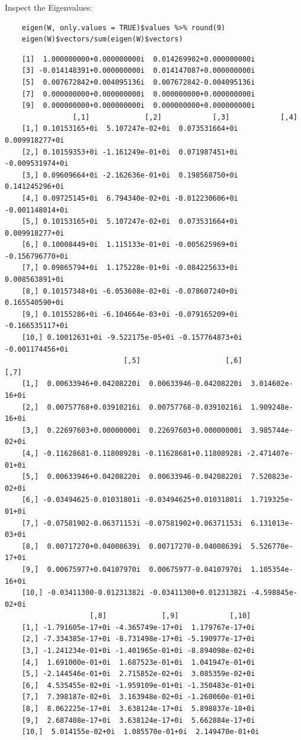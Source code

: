\documentclass[11pt, twoside]{report}
\begin{document}
\newpage
Inspect the Eigenvalues:

\begin{tcolorbox}
    \begin{verbatim}
    eigen(W, only.values = TRUE)$values %>% round(9)
    eigen(W)$vectors/sum(eigen(W)$vectors)
    \end{verbatim}
\tcblower
    \begin{verbatim}
    [1]  1.000000000+0.000000000i  0.014269902+0.000000000i
    [3] -0.014148391+0.000000000i  0.014147087+0.000000000i
    [5]  0.007672842+0.004095136i  0.007672842-0.004095136i
    [7]  0.000000000+0.000000000i  0.000000000+0.000000000i
    [9]  0.000000000+0.000000000i  0.000000000+0.000000000i
                [,1]             [,2]            [,3]            [,4]
    [1,] 0.10153165+0i  5.107247e-02+0i  0.073531664+0i  0.009918277+0i
    [2,] 0.10159353+0i -1.161249e-01+0i  0.071987451+0i -0.009531974+0i
    [3,] 0.09609664+0i -2.162636e-01+0i  0.198568750+0i  0.141245296+0i
    [4,] 0.09725145+0i  6.794340e-02+0i -0.012230606+0i -0.001148014+0i
    [5,] 0.10153165+0i  5.107247e-02+0i  0.073531664+0i  0.009918277+0i
    [6,] 0.10008449+0i  1.115133e-01+0i -0.005625969+0i -0.156796770+0i
    [7,] 0.09865794+0i  1.175228e-01+0i -0.084225633+0i  0.008563891+0i
    [8,] 0.10157348+0i -6.053608e-02+0i -0.078607240+0i  0.165540590+0i
    [9,] 0.10155286+0i -6.104664e-03+0i -0.079165209+0i -0.166535117+0i
    [10,] 0.10012631+0i -9.522175e-05+0i -0.157764873+0i -0.001174456+0i
                            [,5]                    [,6]             [,7]
    [1,]  0.00633946+0.04208220i  0.00633946-0.04208220i  3.014602e-16+0i
    [2,]  0.00757768+0.03910216i  0.00757768-0.03910216i  1.909248e-16+0i
    [3,]  0.22697603+0.00000000i  0.22697603+0.00000000i  3.985744e-02+0i
    [4,] -0.11628681-0.11808928i -0.11628681+0.11808928i -2.471407e-01+0i
    [5,]  0.00633946+0.04208220i  0.00633946-0.04208220i  7.520823e-02+0i
    [6,] -0.03494625-0.01031801i -0.03494625+0.01031801i  1.719325e-01+0i
    [7,] -0.07581902-0.06371153i -0.07581902+0.06371153i  6.131013e-03+0i
    [8,]  0.00717270+0.04008639i  0.00717270-0.04008639i  5.526770e-17+0i
    [9,]  0.00675977+0.04107970i  0.00675977-0.04107970i  1.105354e-16+0i
    [10,] -0.03411300-0.01231382i -0.03411300+0.01231382i -4.598845e-02+0i
                    [,8]             [,9]            [,10]
    [1,] -1.791605e-17+0i -4.365749e-17+0i  1.179767e-17+0i
    [2,] -7.334385e-17+0i -8.731498e-17+0i -5.190977e-17+0i
    [3,] -1.241234e-01+0i -1.401965e-01+0i -8.894098e-02+0i
    [4,]  1.691000e-01+0i  1.687523e-01+0i  1.041947e-01+0i
    [5,] -2.144546e-01+0i  2.715852e-02+0i  3.085359e-02+0i
    [6,]  4.535455e-02+0i -1.959109e-01+0i -1.350483e-01+0i
    [7,]  7.398187e-02+0i  3.163948e-02+0i -1.260060e-01+0i
    [8,]  8.062225e-17+0i  3.638124e-17+0i  5.898837e-18+0i
    [9,]  2.687408e-17+0i  3.638124e-17+0i  5.662884e-17+0i
    [10,]  5.014155e-02+0i  1.085570e-01+0i  2.149470e-01+0i
    \end{verbatim}
\end{tcolorbox}
\end{document}
